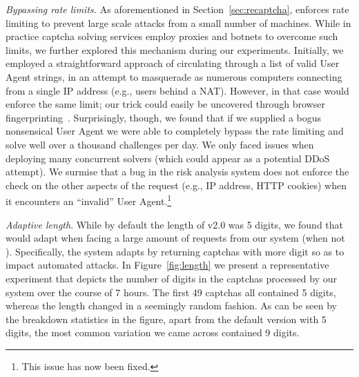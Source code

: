 \emph{Bypassing rate limits.} As aforementioned in Section~\ref{sec:recaptcha}, \re enforces 
rate limiting to prevent large scale attacks from a small number of machines. While in practice
captcha solving services employ proxies and botnets
to overcome such limits, we further explored this mechanism during our experiments. Initially,
we employed a straightforward approach of circulating through a list of valid User Agent strings,
in an attempt to masquerade as numerous computers connecting from a single IP address (e.g., users behind a NAT).
However, in that case \re would enforce the same limit; our trick could easily be uncovered
through browser fingerprinting~\cite{laperdrix2016beauty}. Surprisingly, though, we found that if we 
supplied a bogus nonsensical User Agent we were able to completely bypass the rate limiting
and solve well over a thousand challenges per day.
We only faced issues when deploying many concurrent solvers (which could appear as a potential DDoS attempt).
We surmise that a bug in the risk analysis
system does not enforce the check on the other aspects of the request (e.g., IP address, HTTP cookies) when
it encounters an ``invalid'' User Agent.\footnote{This issue has now been fixed.}

\emph{Adaptive length}.
While by default the length of \re v2.0 was 5 digits, we found %
that \re would adapt when facing a large amount of requests from our system (when not ).
Specifically, the system adapts by returning captchas with more digit so as to impact automated attacks.
In Figure~\ref{fig:length} we present a representative experiment that depicts the number of digits in the captchas
processed by our system over the course of 7 hours. The first 49 captchas all contained 5 digits, whereas the length
changed in a seemingly random fashion. As can be seen by the breakdown statistics in the figure, apart from the default
version with 5 digits, the most common variation we came across contained 9 digits. 

